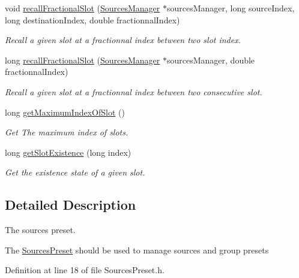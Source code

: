\begin{DoxyCompactItemize}
void \hyperlink{class_hoa2_d_1_1_sources_preset_a4a3e373550dd48727b9d16586e546ec8}{recall\-Fractional\-Slot} (\hyperlink{class_hoa2_d_1_1_sources_manager}{Sources\-Manager} $\ast$sources\-Manager, long source\-Index, long destination\-Index, double fractionnal\-Index)
\begin{DoxyCompactList}\small\item\em Recall a given slot at a fractionnal index between two slot index. \end{DoxyCompactList}\item 
long \hyperlink{class_hoa2_d_1_1_sources_preset_a81b9d06eac962204b2b1c7ee93f03d46}{recall\-Fractional\-Slot} (\hyperlink{class_hoa2_d_1_1_sources_manager}{Sources\-Manager} $\ast$sources\-Manager, double fractionnal\-Index)
\begin{DoxyCompactList}\small\item\em Recall a given slot at a fractionnal index between two consecutive slot. \end{DoxyCompactList}\item 
\hypertarget{class_hoa2_d_1_1_sources_preset_a47d31bbb24565d050c44acf109fb959c}{long \hyperlink{class_hoa2_d_1_1_sources_preset_a47d31bbb24565d050c44acf109fb959c}{get\-Maximum\-Index\-Of\-Slot} ()}\label{class_hoa2_d_1_1_sources_preset_a47d31bbb24565d050c44acf109fb959c}

\begin{DoxyCompactList}\small\item\em Get The maximum index of slots. \end{DoxyCompactList}\item 
long \hyperlink{class_hoa2_d_1_1_sources_preset_a41fa4317089deb163f149e84248e2d0e}{get\-Slot\-Existence} (long index)
\begin{DoxyCompactList}\small\item\em Get the existence state of a given slot. \end{DoxyCompactList}\end{DoxyCompactItemize}


\subsection{Detailed Description}
The sources preset. 

The \hyperlink{class_hoa2_d_1_1_sources_preset}{Sources\-Preset} should be used to manage sources and group presets 

Definition at line 18 of file Sources\-Preset.\-h.



